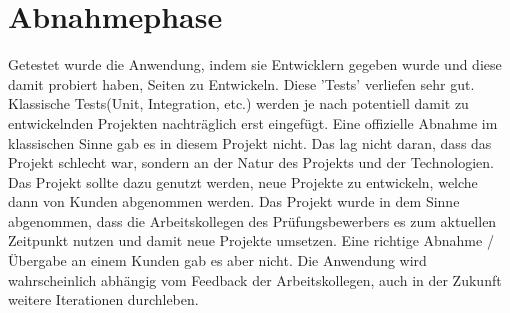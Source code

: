 \section{Abnahmephase} 
\label{sec:Abnahmephase}
Getestet wurde die Anwendung, indem sie Entwicklern gegeben wurde und diese damit probiert haben, Seiten zu Entwickeln. Diese 'Tests' verliefen sehr gut. Klassische Tests(Unit, Integration, etc.) werden je nach potentiell damit zu entwickelnden Projekten nachträglich erst eingefügt. Eine offizielle Abnahme im klassischen Sinne gab es in diesem Projekt nicht. Das lag nicht daran, dass das Projekt schlecht war, sondern an der Natur des Projekts und der Technologien. Das Projekt sollte dazu genutzt werden, neue Projekte zu entwickeln, welche dann von Kunden abgenommen werden. Das Projekt wurde in dem Sinne abgenommen, dass die Arbeitskollegen des Prüfungsbewerbers es zum aktuellen Zeitpunkt nutzen und damit neue Projekte umsetzen. Eine richtige Abnahme / Übergabe an einem Kunden gab es aber nicht. Die Anwendung wird wahrscheinlich abhängig vom Feedback der Arbeitskollegen, auch in der Zukunft weitere Iterationen durchleben.
